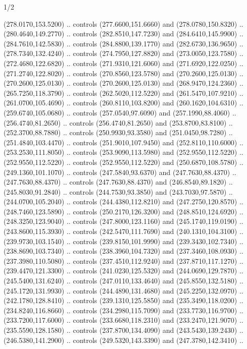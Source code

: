\begin{flagdescription}{1/2}
\begin{scope}[xshift=0.5\flaglength]
\begin{scope}[scale=0.004\flagwidth,xshift=-90mm,yshift=89mm]
\begin{scope}[y=0.80pt, x=0.80pt, yscale=-1, xscale=1, inner sep=0pt, outer sep=0pt]
  (278.0170,153.5200) .. controls (277.6600,151.6660) and (278.0780,150.8320) ..
  (280.4640,149.2770) .. controls (282.8510,147.7230) and (284.6410,145.9900) ..
  (284.7610,142.5830) .. controls (284.8800,139.1770) and (282.6730,136.9650) ..
  (278.7340,132.4240) .. controls (274.7950,127.8820) and (273.0050,123.7580) ..
  (272.4680,122.6820) .. controls (271.9310,121.6060) and (271.6920,122.0250) ..
  (271.2740,122.8020) .. controls (270.8560,123.5780) and (270.2600,125.0130) ..
  (270.2600,125.0130) .. controls (270.2600,125.0130) and (268.9470,124.2360) ..
  (265.7250,118.3790) .. controls (262.5020,112.5220) and (261.5470,107.9210) ..
  (261.0700,105.4690) .. controls (260.8110,103.8200) and (260.1620,104.6310) ..
  (259.6740,105.0680) .. controls (257.0540,97.6090) and (257.1990,88.4060) ..
  (256.4740,81.2650) .. controls (256.4740,81.2650) and (253.8700,83.8100) ..
  (252.3700,88.7880) .. controls (250.9930,93.3580) and (251.0450,98.7280) ..
  (251.4840,103.4470) .. controls (251.9010,107.9450) and (252.8110,110.6000) ..
  (253.2530,111.8050) .. controls (253.9090,113.5980) and (252.9550,112.5220) ..
  (252.9550,112.5220) .. controls (252.9550,112.5220) and (250.6870,108.5780) ..
  (249.1360,101.1070) .. controls (247.5840,93.6370) and (247.7630,88.4370) ..
  (247.7630,88.4370) .. controls (247.7630,88.4370) and (246.8540,89.1820) ..
  (245.8030,91.2840) .. controls (244.7530,93.3850) and (243.7030,97.5870) ..
  (244.0700,105.2040) .. controls (244.4380,112.8210) and (247.2750,120.8570) ..
  (248.7460,123.5890) .. controls (250.2170,126.3200) and (248.8510,124.6920) ..
  (248.3250,123.9040) .. controls (247.8000,123.1160) and (245.1740,119.0190) ..
  (243.8600,115.3930) .. controls (242.5470,111.7690) and (240.1310,104.3100) ..
  (239.9730,103.1540) .. controls (239.8150,101.9990) and (239.3430,102.7340) ..
  (238.8690,103.7340) .. controls (238.3960,104.7320) and (237.3460,108.0930) ..
  (237.3980,110.5080) .. controls (237.4510,112.9240) and (237.8710,117.1270) ..
  (239.4470,121.3300) .. controls (241.0230,125.5320) and (244.0690,129.7870) ..
  (245.5400,131.6240) .. controls (247.0110,133.4640) and (245.8550,132.5180) ..
  (245.1720,131.9930) .. controls (244.4890,131.4680) and (245.2250,132.0970) ..
  (242.1780,128.8410) .. controls (239.1310,125.5850) and (235.3490,118.0200) ..
  (234.8240,116.8660) .. controls (234.2980,115.7090) and (233.7730,116.9700) ..
  (233.7200,117.6000) .. controls (233.6680,118.2310) and (233.2470,121.9070) ..
  (235.5590,128.1580) .. controls (237.8700,134.4090) and (243.5430,139.2430) ..
  (246.5380,141.2900) .. controls (249.5320,143.3390) and (247.3780,142.3410) ..

\end{scope}
\end{scope}
\end{scope}
\end{flagdescription}
